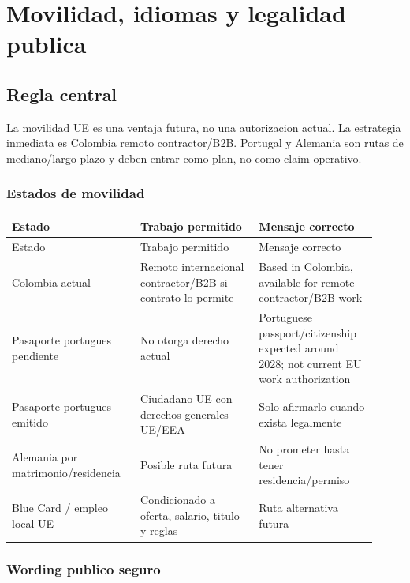 \chapter{Movilidad, idiomas y legalidad publica}

\section{Regla central}


La movilidad UE es una ventaja futura, no una autorizacion actual. La estrategia inmediata es Colombia remoto contractor/B2B. Portugal y Alemania son rutas de mediano/largo plazo y deben entrar como plan, no como claim operativo.


\subsection{Estados de movilidad}


\begin{center}
\scriptsize
\begin{longtable}{>{\raggedright\arraybackslash}p{0.305\linewidth} >{\raggedright\arraybackslash}p{0.305\linewidth} >{\raggedright\arraybackslash}p{0.305\linewidth}}
\toprule
Estado & Trabajo permitido & Mensaje correcto \\
\midrule
\endfirsthead
\toprule
Estado & Trabajo permitido & Mensaje correcto \\
\midrule
\endhead
Colombia actual & Remoto internacional contractor/B2B si contrato lo permite & Based in Colombia, available for remote contractor/B2B work \\
Pasaporte portugues pendiente & No otorga derecho actual & Portuguese passport/citizenship expected around 2028; not current EU work authorization \\
Pasaporte portugues emitido & Ciudadano UE con derechos generales UE/EEA & Solo afirmarlo cuando exista legalmente \\
Alemania por matrimonio/residencia & Posible ruta futura & No prometer hasta tener residencia/permiso \\
Blue Card / empleo local UE & Condicionado a oferta, salario, titulo y reglas & Ruta alternativa futura \\
\bottomrule
\end{longtable}
\end{center}


\subsection{Wording publico seguro}



